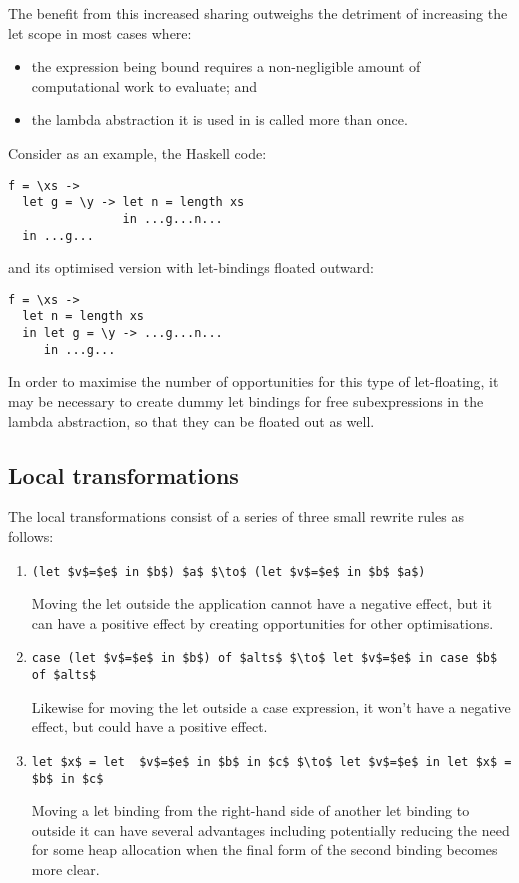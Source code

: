The benefit from this increased sharing outweighs the detriment of increasing the let scope in most cases where:
\begin{itemize}
\item the expression being bound requires a non-negligible amount of computational work to evaluate; and
\item the lambda abstraction it is used in is called more than once.\cite{jones1996}
\end{itemize}

Consider as an example, the Haskell code\cite{jones1996}:
\begin{lstlisting}
f = \xs ->
  let g = \y -> let n = length xs
                in ...g...n...
  in ...g...
\end{lstlisting}

and its optimised version with let-bindings floated outward:
\begin{lstlisting}
f = \xs ->
  let n = length xs
  in let g = \y -> ...g...n...
     in ...g...
\end{lstlisting}

In order to maximise the number of opportunities for this type of let-floating, it may be necessary to create dummy let bindings for free subexpressions in the lambda abstraction, so that they can be floated out as well.\cite{jones1996}

\subsection*{Local transformations}

The local transformations consist of a series of three small rewrite rules as follows:

\begin{enumerate}
\item \lstinline[style=math]{(let $v$=$e$ in $b$) $a$ $\to$ (let $v$=$e$ in $b$ $a$)}

Moving the let outside the application cannot have a negative effect, but it can have a positive effect by creating opportunities for other optimisations.\cite{jones1996}

\item \lstinline[style=math]{case (let $v$=$e$ in $b$) of $alts$ $\to$ let $v$=$e$ in case $b$ of $alts$}

Likewise for moving the let outside a case expression, it won't have a negative effect, but could have a positive effect.\cite{jones1996}

\item \lstinline[style=math]{let $x$ = let  $v$=$e$ in $b$ in $c$ $\to$ let $v$=$e$ in let $x$ = $b$ in $c$}

Moving a let binding from the right-hand side of another let binding to outside it can have several advantages including potentially reducing the need for some heap allocation when the final form of the second binding becomes more clear.\cite{jones1996}
\end{enumerate}

